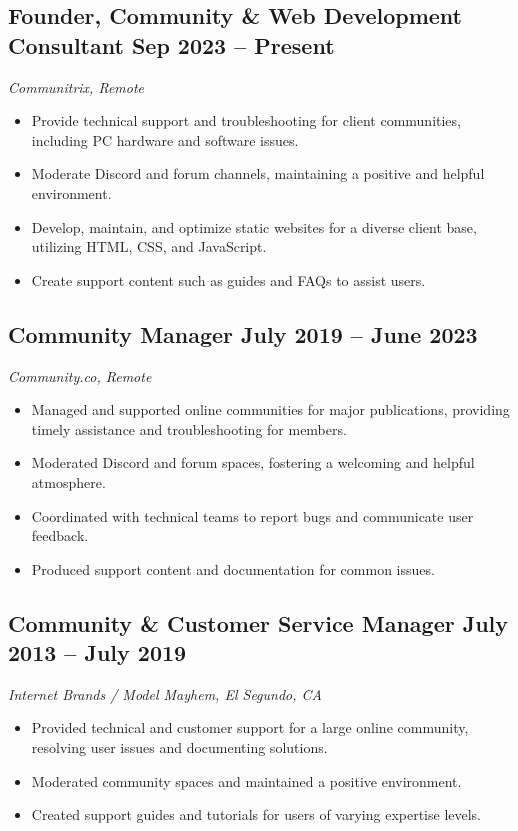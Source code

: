 \documentclass[a4paper,12pt]{article} %
\begin{document}
\subsection{Founder, Community \& Web Development Consultant \hfill Sep 2023 – Present}
\textit{Communitrix, Remote}
\begin{itemize}
    \item Provide technical support and troubleshooting for client communities, including PC hardware and software issues.
    \item Moderate Discord and forum channels, maintaining a positive and helpful environment.
    \item Develop, maintain, and optimize static websites for a diverse client base, utilizing HTML, CSS, and JavaScript.
    \item Create support content such as guides and FAQs to assist users.
\end{itemize}

\subsection{Community Manager \hfill July 2019 – June 2023}
\textit{Community.co, Remote}
\begin{itemize}
    \item Managed and supported online communities for major publications, providing timely assistance and troubleshooting for members.
    \item Moderated Discord and forum spaces, fostering a welcoming and helpful atmosphere.
    \item Coordinated with technical teams to report bugs and communicate user feedback.
    \item Produced support content and documentation for common issues.
\end{itemize}

\subsection{Community \& Customer Service Manager \hfill July 2013 – July 2019}
\textit{Internet Brands / Model Mayhem, El Segundo, CA}
\begin{itemize}
    \item Provided technical and customer support for a large online community, resolving user issues and documenting solutions.
    \item Moderated community spaces and maintained a positive environment.
    \item Created support guides and tutorials for users of varying expertise levels.
\end{itemize}
\end{document}
